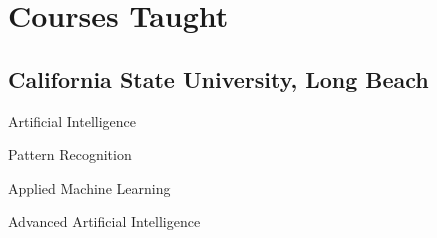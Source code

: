 \documentclass[11pt,letterpaper]{report}
\newcommand{\listitemspace}{0.25em}
\renewenvironment{itemize}
{\begin{list}{}{\setlength{\leftmargin}{0em}
                \setlength{\parskip}{0em}
                \setlength{\itemsep}{\listitemspace}
                \setlength{\parsep}{\listitemspace}}}
{\end{list}}
\begin{document}









    \section*{Courses Taught}

    \subsection*{California State University, Long Beach}

    \begin{itemize}

        \item Artificial Intelligence
        \item Pattern Recognition
        \item Applied Machine Learning
        \item Advanced Artificial Intelligence
    \end{itemize}
\end{document}
